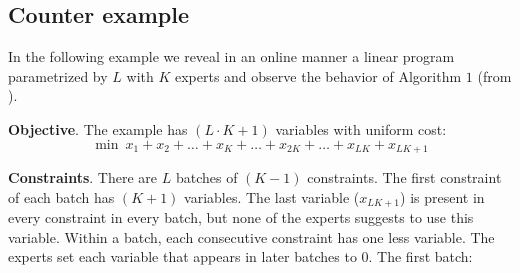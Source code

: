 \subsection{Counter example}

In the following example we reveal in an online manner a linear program parametrized by $L$ with $K$ experts and observe the behavior of Algorithm $1$ (from \cite{AnandGe22:Online-Algorithms}).

\medskip

\noindent \textbf{Objective}. The example has $(L \cdot K + 1)$ variables with uniform cost:
\[ \min\ x_1 + x_2 + \dots + x_{K} + \dots + x_{2K} + \dots + x_{LK} + x_{LK+1}\]

\noindent \textbf{Constraints}. There are $L$ batches of $(K - 1)$ constraints. The first constraint of each batch has $(K+1)$ variables. The last variable ($x_{LK+1}$) is present in every constraint in every batch, but none of the experts suggests to use this variable. Within a batch, each consecutive constraint has one less variable. The experts set each variable that appears in later batches to $0$. The first batch:
%
